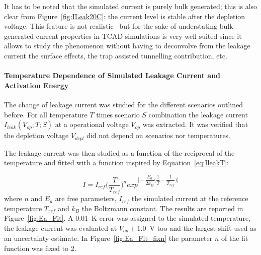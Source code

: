 It has to be noted that  the simulated current is purely bulk generated; this is also clear from 
Figure~\ref{fig:ILeak20C}: the current level is stable after the depletion voltage. This feature 
is not realistic~\cite{CALZOLARI19721003} but for the sake of understating bulk generated 
current properties in TCAD simulations is very well suited since it allows to study the 
phenomenon without having to deconvolve from the leakage current the surface effects, the trap assisted 
tunnelling contribution, etc. 

\paragraph{Temperature Dependence of Simulated Leakage Current and Activation Energy}

The change of leakage current was studied for the different scenarios outlined before. 
For all temperature $T$ times scenario $S$ combination the leakage current $I_{leak}(V_{op};T;S)$ 
at a 
operational voltage 
$V_{op}$ 
was extracted. It was verified that the depletion voltage $V_{depl}$ did not depend on scenarios nor temperatures.

 The leakage current was then studied as a function of the reciprocal of the 
temperature and fitted with a function inspired by Equation~\ref{eq:IleakT}:

\begin{equation}
I = I_{ref}\Bigg(\dfrac{T}{T_{ref}}\Bigg)^n exp^{\Bigg[ -\dfrac{E_{a}}{2k_B}\Bigg( \dfrac{1}{T}- \dfrac{1}{T_{ref}} \Bigg) \Bigg]}
\label{eq:ITfunc}
\end{equation}
where $n$ and $E_{a}$ are free parameters, $I_{ref}$ the simulated current at the reference 
temperature $T_{ref}$ and $k_B$ the Boltzmann constant.
The results are reported in Figure~\ref{fig:Ea_Fit}. A 0.01~K error was assigned to the 
simulated temperature, the leakage current was evaluated at $V_{op}\pm1.0$~V too and the largest 
shift used as an uncertainty estimate.
In Figure~\ref{fig:Ea_Fit_fixn} the  parameter $n$ of the fit function was fixed to 2.

